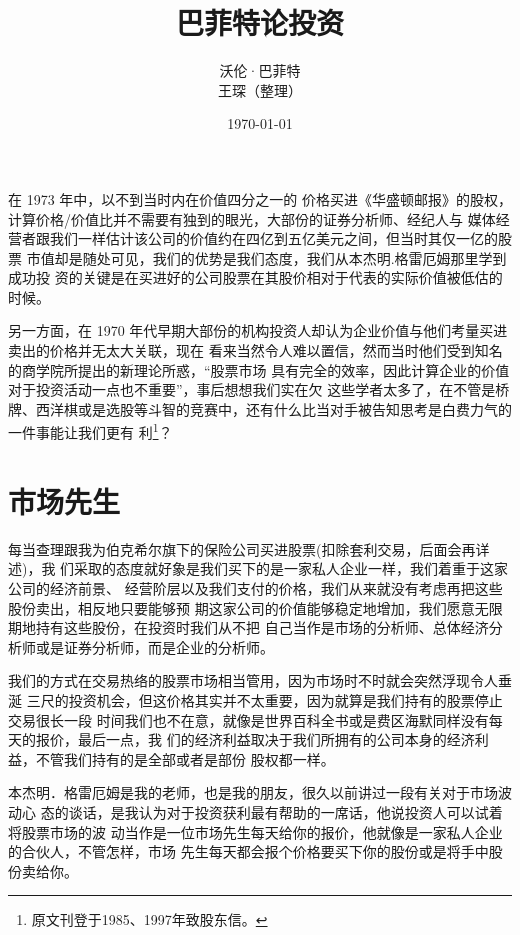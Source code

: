 \documentclass[UTF8,a4paper,zihao=-4,fontset = windows]{ctexart} %
\title{\textbf{巴菲特论投资}} %
\author{沃伦·巴菲特   \\
        王琛（整理）}
\date{\today}
\begin{document}
\maketitle
\newpage
\tableofcontents
\newpage

在 1973 年中，以不到当时内在价值四分之一的
价格买进《华盛顿邮报》的股权，计算价格/价值比并不需要有独到的眼光，大部份的证券分析师、经纪人与
媒体经营者跟我们一样估计该公司的价值约在四亿到五亿美元之间，但当时其仅一亿的股票
市值却是随处可见，我们的优势是我们态度，我们从本杰明.格雷厄姆那里学到成功投
资的关键是在买进好的公司股票在其股价相对于代表的实际价值被低估的时候。

另一方面，在 1970 年代早期大部份的机构投资人却认为企业价值与他们考量买进卖出的价格并无太大关联，现在
看来当然令人难以置信，然而当时他们受到知名的商学院所提出的新理论所惑，“股票市场
具有完全的效率，因此计算企业的价值对于投资活动一点也不重要”，事后想想我们实在欠
这些学者太多了，在不管是桥牌、西洋棋或是选股等斗智的竞赛中，还有什么比当对手被告知思考是白费力气的一件事能让我们更有
利\footnote{原文刊登于1985、1997年致股东信。}？

\section{市场先生}

每当查理跟我为伯克希尔旗下的保险公司买进股票(扣除套利交易，后面会再详述)，我
们采取的态度就好象是我们买下的是一家私人企业一样，我们着重于这家公司的经济前景、
经营阶层以及我们支付的价格，我们从来就没有考虑再把这些股份卖出，相反地只要能够预
期这家公司的价值能够稳定地增加，我们愿意无限期地持有这些股份，在投资时我们从不把
自己当作是市场的分析师、总体经济分析师或是证券分析师，而是企业的分析师。

我们的方式在交易热络的股票市场相当管用，因为市场时不时就会突然浮现令人垂涎
三尺的投资机会，但这价格其实并不太重要，因为就算是我们持有的股票停止交易很长一段
时间我们也不在意，就像是世界百科全书或是费区海默同样没有每天的报价，最后一点，我
们的经济利益取决于我们所拥有的公司本身的经济利益，不管我们持有的是全部或者是部份
股权都一样。

本杰明．格雷厄姆是我的老师，也是我的朋友，很久以前讲过一段有关对于市场波动心
态的谈话，是我认为对于投资获利最有帮助的一席话，他说投资人可以试着将股票市场的波
动当作是一位市场先生每天给你的报价，他就像是一家私人企业的合伙人，不管怎样，市场
先生每天都会报个价格要买下你的股份或是将手中股份卖给你。
\end{document}
